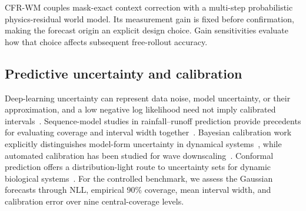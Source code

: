 CFR-WM couples mask-exact context correction with a multi-step probabilistic physics-residual world model. Its measurement gain is fixed before confirmation, making the forecast origin an explicit design choice. Gain sensitivities evaluate how that choice affects subsequent free-rollout accuracy.

\subsection{Predictive uncertainty and calibration}

Deep-learning uncertainty can represent data noise, model uncertainty, or their approximation, and a low negative log likelihood need not imply calibrated intervals~\cite{abdar2021_a_review_of_uncertainty_quantification}. Sequence-model studies in rainfall--runoff prediction provide precedents for evaluating coverage and interval width together~\cite{klotz2022_uncertainty_estimation_with_deep_learning}. Bayesian calibration work explicitly distinguishes model-form uncertainty in dynamical systems~\cite{ramancha2022_accounting_for_model_form_uncertainty}, while automated calibration has been studied for wave downscaling~\cite{alonso2021_automatic_calibration_and_uncertainty_quantification}. Conformal prediction offers a distribution-light route to uncertainty sets for dynamic biological systems~\cite{portela2025_conformal_prediction_for_uncertainty_quantification}. For the controlled benchmark, we assess the Gaussian forecasts through NLL, empirical 90\% coverage, mean interval width, and calibration error over nine central-coverage levels.
